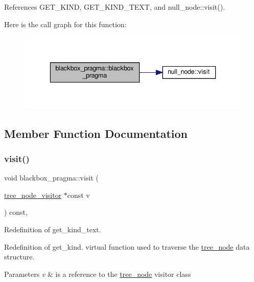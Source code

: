 References G\+E\+T\+\_\+\+K\+I\+ND, G\+E\+T\+\_\+\+K\+I\+N\+D\+\_\+\+T\+E\+XT, and null\+\_\+node\+::visit().

Here is the call graph for this function\+:
\nopagebreak
\begin{figure}[H]
\begin{center}
\leavevmode
\includegraphics[width=336pt]{d5/d3c/structblackbox__pragma_aefe7dbd45022c9193ea86410980dce42_cgraph}
\end{center}
\end{figure}


\subsection{Member Function Documentation}
\mbox{\label{structblackbox__pragma_a8e85a8856e83d67730225e4a1e3297b9}} 
\subsubsection{\texorpdfstring{visit()}{visit()}}
{\footnotesize\ttfamily void blackbox\+\_\+pragma\+::visit (\begin{DoxyParamCaption}\item[{\hyperlink{classtree__node__visitor}{tree\+\_\+node\+\_\+visitor} $\ast$const}]{v }\end{DoxyParamCaption}) const\hspace{0.3cm}{\ttfamily [override]}, {\ttfamily [virtual]}}



Redefinition of get\+\_\+kind\+\_\+text. 

Redefinition of get\+\_\+kind. virtual function used to traverse the \hyperlink{classtree__node}{tree\+\_\+node} data structure. 
\begin{DoxyParams}{Parameters}
{\em v} & is a reference to the \hyperlink{classtree__node}{tree\+\_\+node} visitor class \\
\hline
\end{DoxyParams}


